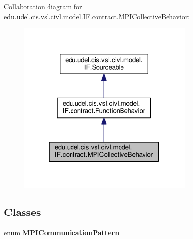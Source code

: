 Collaboration diagram for edu.\+udel.\+cis.\+vsl.\+civl.\+model.\+I\+F.\+contract.\+M\+P\+I\+Collective\+Behavior\+:
\nopagebreak
\begin{figure}[H]
\begin{center}
\leavevmode
\includegraphics[width=247pt]{interfaceedu_1_1udel_1_1cis_1_1vsl_1_1civl_1_1model_1_1IF_1_1contract_1_1MPICollectiveBehavior__coll__graph}
\end{center}
\end{figure}
\subsection*{Classes}
\begin{DoxyCompactItemize}
\item 
enum {\bfseries M\+P\+I\+Communication\+Pattern}
\end{DoxyCompactItemize}
